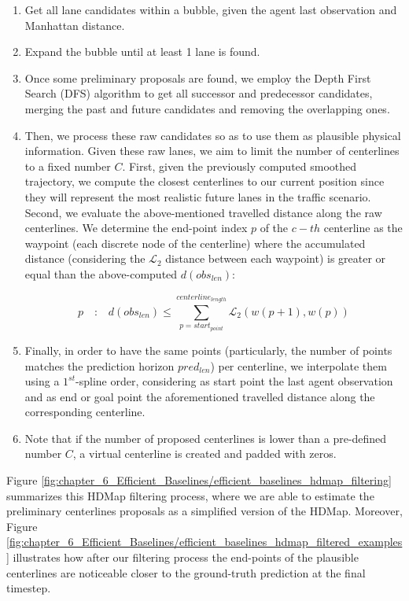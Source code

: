 \begin{enumerate}
	\item Get all lane candidates within a bubble, given the agent last observation and Manhattan distance.
	
	\item Expand the bubble until at least 1 lane is found.
	
	\item Once some preliminary proposals are found, we employ the Depth First Search (DFS) algorithm to get all successor and predecessor candidates, merging the past and future candidates and removing the overlapping ones.
	
	\item Then, we process these raw candidates so as to use them as plausible physical information. Given these raw lanes, we aim to limit the number of centerlines to a fixed number $C$. First, given the previously computed smoothed trajectory, we compute the closest centerlines to our current position since they will represent the most realistic future lanes in the traffic scenario. Second, we evaluate the above-mentioned travelled distance along the raw centerlines. We determine the end-point index $p$ of the $c-th$ centerline  as the waypoint (each discrete node of the centerline) where the accumulated distance (considering the $\mathcal{L}_2$ distance between each waypoint) is greater or equal than the above-computed $d(obs_{len})$:
	
	\begin{equation}
		p \quad \textbf{:} \quad d(obs_{len}) \leq \sum_{p=start_{point}}^{centerline_{length}} \mathcal{L}_2(w(p+1),w(p))
	\end{equation}
	
	\item Finally, in order to have the same points (particularly, the number of points matches the prediction horizon $pred_{len}$) per centerline, we interpolate them using a $1^{st}$-spline order, considering as start point the last agent observation and as end or goal point the aforementioned travelled distance along the corresponding centerline.
	
	\item Note that if the number of proposed centerlines is lower than a pre-defined number $C$, a virtual centerline is created and padded with zeros.
\end{enumerate}

Figure \ref{fig:chapter_6_Efficient_Baselines/efficient_baselines_hdmap_filtering} summarizes this \ac{HDMap} filtering process, where we are able to estimate the preliminary centerlines proposals as a simplified version of the \ac{HDMap}. Moreover, Figure \ref{fig:chapter_6_Efficient_Baselines/efficient_baselines_hdmap_filtered_examples} illustrates how after our filtering process the end-points of the plausible centerlines are noticeable closer to the ground-truth prediction at the final timestep. 

